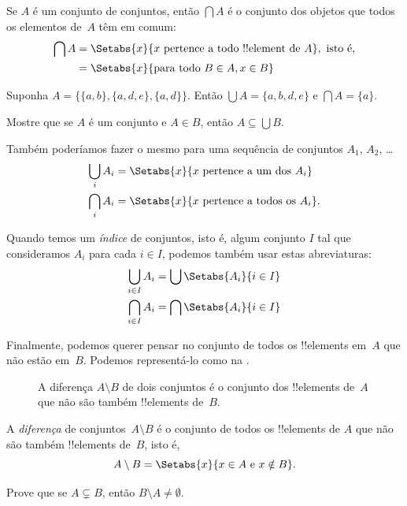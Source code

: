 \documentclass[../../../include/open-logic-section]{subfiles}
\begin{document}
\begin{defn}
Se $A$ é um conjunto de conjuntos, então $\bigcap A$ é o conjunto dos objetos que
todos os elementos de~$A$ têm em comum:
\begin{align*}
\bigcap A & = \Setabs{x}{x \text{ pertence a todo !!{element} de } A},
\text{ isto é,}\\
 & = \Setabs{x}{\text{para todo } B \in A, x \in B}
\end{align*}
\end{defn}

\begin{ex}
Suponha $A = \{ \{ a, b \}, \{ a, d, e \}, \{ a, d \} \}$.
Então $\bigcup A = \{ a, b, d, e \}$ e $\bigcap A = \{ a \}$.
\end{ex}
\begin{prob}
	Mostre que se $A$ é um conjunto e $A \in B$, então $A \subseteq \bigcup B$.
\end{prob}

Também poderíamos fazer o mesmo para uma sequência de conjuntos $A_1$, $A_2$, \dots
\begin{align*}
\bigcup_i A_i & = \Setabs{x}{x \text{ pertence a um dos } A_i}\\
\bigcap_i A_i & = \Setabs{x}{x \text{ pertence a todos os } A_i}.
\end{align*}

Quando temos um \emph{índice} de conjuntos, isto é, algum conjunto $I$ tal que
consideramos $A_i$ para cada $i \in I$, podemos também usar estas
abreviaturas:
\begin{align*}
	\bigcup_{i \in I} A_i & = \bigcup \Setabs{A_i }{i \in I}\\
	\bigcap_{i \in I} A_i & = \bigcap\Setabs{A_i}{i \in I}
\end{align*}

Finalmente, podemos querer pensar no conjunto de todos os !!{element}s em~$A$
que não estão em~$B$. Podemos representá-lo como na .

\begin{figure}[H]
  \caption{A diferença $A \setminus B$ de dois conjuntos é o conjunto dos
    !!{element}s de~$A$ que não são também !!{element}s de~$B$.}
\end{figure}

\begin{defn}[Diferença]
A \emph{diferença} de conjuntos~$A \setminus B$ é o conjunto de todos os !!{element}s de
$A$ que não são também !!{element}s de~$B$, isto é,
\[
A\setminus B = \Setabs{x}{x\in A \text{ e } x \notin B}.
\]
\end{defn}

\begin{prob}
	Prove que se $A \subsetneq B$, então $B \setminus A \neq \emptyset$.
\end{prob}
\end{document}
